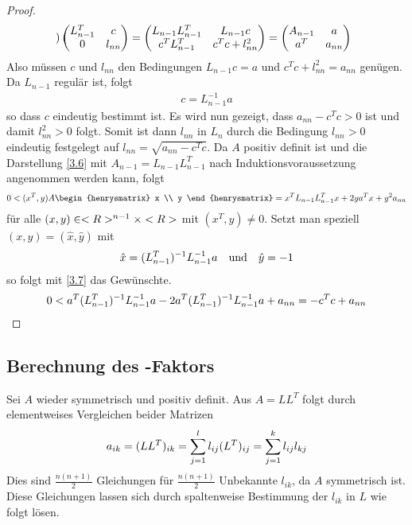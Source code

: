 \begin{proof}
\begin{align}
\begin{pmatrix}
		\end{pmatrix} \begin{pmatrix}
			L^T_{n-1} & c \\ 0 & l_{nn}
		\end{pmatrix} = \begin{pmatrix}
			L_{n-1}L^T_{n-1} & L_{n-1}c \\ c^TL^T_{n-1} & c^Tc+l_{nn}^2
		\end{pmatrix} = \begin{pmatrix}
			A_{n-1} & a \\ a ^T & a_{nn}
		\end{pmatrix}\notag
	\end{align}
	Also müssen $c$ und $l_{nn}$ den Bedingungen $L_{n-1}c=a$ und $c^Tc+l_{nn}^2=a_{nn}$ genügen. Da $L_{n-1}$ regulär ist, folgt  
	\begin{align}
		\label{3.7}
		c=L_{n-1}^{-1}a
	\end{align}
	so dass $c$ eindeutig bestimmt ist. Es wird nun gezeigt, dass $a_{nn}-c^Tc>0$ ist und damit $l_{nn}^2>0$ folgt. Somit ist dann $l_{nn}$ in $L_n$ durch die Bedingung $l_{nn}>0$ eindeutig festgelegt auf $l_{nn}=\sqrt{a_{nn}-c^Tc}$. Da $A$ positiv definit ist und die Darstellung \cref{3.6} mit $A_{n-1}=L_{n-1}L_{n-1}^T$ nach Induktionsvoraussetzung angenommen werden kann, folgt
	\begin{align}
		0 < (x^T,y)A\begin{henrysmatrix}
			x \\ y
		\end{henrysmatrix} = x^TL_{n-1}L_{n-1}^Tx+2ya^Tx+y^2a_{nn}\notag
	\end{align}
	für alle $(x,y)\in <R>^{n-1}\times<R>$ mit $(x^T,y)\neq 0$. Setzt man speziell $(x,y)=(\hat{x},\hat{y})$ mit
	\begin{align}
		\hat{x} = (L_{n-1}^T)^{-1}L_{n-1}^{-1}a\quad\text{und}\quad\hat{y}=-1\notag
	\end{align}
	so folgt mit \cref{3.7} das Gewünschte. 
	\begin{align}
		0 < a^T(L_{n-1}^T)^{-1}L_{n-1}^{-1}a-2a^T(L_{n-1}^T)^{-1}L_{n-1}^{-1}a+a_{nn} = -c^Tc+a_{nn}\notag
	\end{align}
\end{proof}

\subsection{Berechnung des -Faktors}

Sei $A$ wieder symmetrisch und positiv definit. Aus $A=LL^T$ folgt durch elementweises Vergleichen beider Matrizen
\begin{align}
	a_{ik} = (LL^T)_{ik} = \sum_{j=1}^{l}l_{ij}(L^T)_{ij} = \sum_{j=1}^k l_{ij}l_{kj}\notag
\end{align}
Dies sind $\frac{n(n+1)}{2}$ Gleichungen für $\frac{n(n+1)}{2}$ Unbekannte $l_{ik}$, da $A$ symmetrisch ist. Diese Gleichungen lassen sich durch spaltenweise Bestimmung der $l_{ik}$ in $L$ wie folgt lösen.

